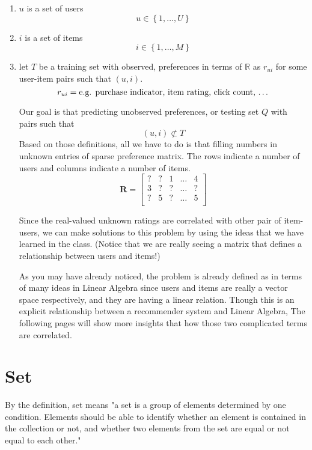 \documentclass[paper=a4, fontsize=11pt]{scrartcl} %
\numberwithin{equation}{section} %
\numberwithin{figure}{section} %
\numberwithin{table}{section} %
\newcommand{\matxxx}[3] {
\begin{bmatrix}
  #1 \\
  #2 \\
  #3 \\
\end{bmatrix}
}
\begin{document}
\begin{enumerate}
	\item \(u\) is a set of users
	\[
		u \in \left\{ 1, \dots, U \right\}
	\]
	\item \(i\) is a set of items
	\[
		i \in \left\{ 1, \dots, M \right\}
	\]
	\item let \(T\) be a training set with observed,
	preferences in terms of \(\mathbb{R}\) as \(r_{ui}\) for some user-item pairs such that \((u,i)\).
	\[
		r_{ui} = \mbox{e.g. purchase indicator, item rating, click count, \dots}
	\]

	Our goal is that predicting unobserved preferences, or testing set \(Q\) with pairs such that \[(u,i) \not\subset T\]
	Based on those definitions, all we have to do is that filling numbers in unknown entries of sparse preference matrix.
	The rows indicate a number of users and columns indicate a number of items.
	\[
		\mathbf{R} =
		\matxxx
		{? & ? & 1 & \dots & 4}
		{3 & ? & ? & \dots & ?}
		{? & 5 & ? & \dots & 5}
	\]

	Since the real-valued unknown ratings are correlated with other pair of item-users,
	we can make solutions to this problem by using the ideas that we have learned in the class.
	(Notice that we are really seeing a matrix that defines a relationship between users and items!)

	As you may have already noticed, the problem is already defined as in terms of many ideas in Linear Algebra since
	users and items are really a vector space respectively, and they are having a linear relation.
	Though this is an explicit relationship between a recommender system and Linear Algebra,
	The following pages will show more insights that how those two complicated terms are correlated.

\end{enumerate}


\section{Set}
By the definition, set means "a set is a group of elements determined by one condition. Elements should be able to identify whether an element is contained in the collection or not, and whether two elements from the set are equal or not equal to each other."
\end{document}
